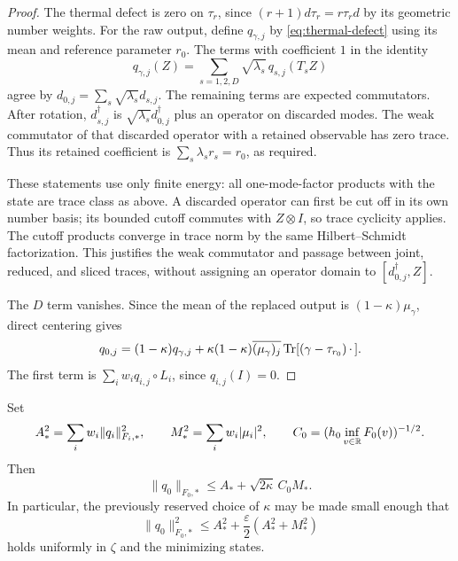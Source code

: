 \begin{proof}
The thermal defect is zero on $\tau_r$, since
$(r+1)d\tau_r=r\tau_rd$ by its geometric number weights.
For the raw output, define $q_{\gamma,j}$ by
\eqref{eq:thermal-defect} using its mean and reference parameter $r_0$.
The terms with coefficient $1$ in the identity
\[
 q_{\gamma,j}(Z)
 =\sum_{s=1,2,D}\sqrt{\lambda_s}\,q_{s,j}(T_sZ)
\]
agree by $d_{0,j}=\sum_s\sqrt{\lambda_s}d_{s,j}$.
The remaining terms are expected commutators.  After rotation,
$d_{s,j}^\dagger$ is $\sqrt{\lambda_s}d_{0,j}^\dagger$ plus an operator
on discarded modes.  The weak commutator of that discarded operator with
a retained observable has zero trace.  Thus its retained coefficient is
$\sum_s\lambda_sr_s=r_0$, as required.

These statements use only finite energy: all one-mode-factor products
with the state are trace class as above.  A discarded operator can first
be cut off in its own number basis; its bounded cutoff commutes with
$Z\otimes I$, so trace cyclicity applies.  The cutoff products converge
in trace norm by the same Hilbert--Schmidt factorization.  This justifies
the weak commutator and passage between joint, reduced, and sliced traces,
without assigning an operator domain to $[d_{0,j}^\dagger,Z]$.

The $D$ term vanishes.  Since the mean of the replaced output is
$(1-\kappa)\mu_\gamma$, direct centering gives
\[
 q_{0,j}=(1-\kappa)q_{\gamma,j}
  +\kappa(1-\kappa)\overline{(\mu_\gamma)_j}
       \operatorname{Tr}[(\gamma-\tau_{r_0})\,\cdot\,].
\]
The first term is $\sum_iw_iq_{i,j}\circ L_i$, since $q_{i,j}(I)=0$.
\end{proof}

\begin{proposition}\label{prop:defect-estimate}
Set
\[
 A_*^2=\sum_iw_i\|q_i\|_{F_i,*}^2,
 \qquad M_*^2=\sum_iw_i|\mu_i|^2,
 \qquad C_0=(h_0\inf_{v\in\mathbb R}F_0(v))^{-1/2}.
\]
Then
\begin{equation}\label{eq:defect-triangle}
 \|q_0\|_{F_0,*}\le A_*+\sqrt{2\kappa}\,C_0M_*.
\end{equation}
In particular, the previously reserved choice of $\kappa$ may be made
small enough that
\begin{equation}\label{eq:defect-estimate}
 \|q_0\|_{F_0,*}^2
 \le A_*^2+\frac\varepsilon2(A_*^2+M_*^2)
\end{equation}
holds uniformly in $\zeta$ and the minimizing states.
\end{proposition}

